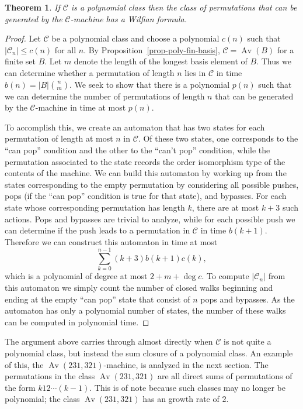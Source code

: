 \documentclass[10pt]{article}
\theoremstyle{plain}
\newtheorem{theorem}{Theorem}[section]
\theoremstyle{definition}
\newcommand{\Av}{\operatorname{Av}}
\newcommand{\C}{\mathcal{C}}
\begin{document}
\begin{theorem}
\label{thm-poly-machine}
If $\C$ is a polynomial class then the class of permutations that can be generated by the $\C$-machine has a Wilfian formula.
\end{theorem}
\begin{proof}
Let $\C$ be a polynomial class and choose a polynomial $c(n)$ such that $|\C_n|\le c(n)$ for all $n$. By Proposition~\ref{prop-poly-fin-basis}, $\C=\Av(B)$ for a finite set $B$. Let $m$ denote the length of the longest basis element of $B$. Thus we can determine whether a permutation of length $n$ lies in $\C$ in time $b(n)=|B|{n\choose m}$. We seek to show that there is a polynomial $p(n)$ such that we can determine the number of permutations of length $n$ that can be generated by the $\C$-machine in time at most $p(n)$.

To accomplish this, we create an automaton that has two states for each permutation of length at most $n$ in $\C$. Of these two states, one corresponds to the ``can pop'' condition and the other to the ``can't pop'' condition, while the permutation associated to the state records the order isomorphism type of the contents of the machine. We can build this automaton by working up from the states corresponding to the empty permutation by considering all possible pushes, pops (if the ``can pop'' condition is true for that state), and bypasses. For each state whose corresponding permutation has length $k$, there are at most $k+3$ such actions. Pops and bypasses are trivial to analyze, while for each possible push we can determine if the push leads to a permutation in $\C$ in time $b(k+1)$. Therefore we can construct this automaton in time at most
\[
	\sum_{k=0}^{n-1} (k+3)b(k+1)c(k),
\]
which is a polynomial of degree at most $2+m+\deg c$. To compute $|\C_n|$ from this automaton we simply count the number of closed walks beginning and ending at the empty ``can pop'' state that consist of $n$ pops and bypasses. As the automaton has only a polynomial number of states, the number of these walks can be computed in polynomial time.
\end{proof}

The argument above carries through almost directly when $\C$ is not quite a polynomial class, but instead the sum closure of a polynomial class. An example of this, the $\Av(231,321)$-machine, is analyzed in the next section. The permutations in the class $\Av(231,321)$ are all direct sums of permutations of the form $k12\cdots(k-1)$. This is of note because such classes may no longer be polynomial; the class $\Av(231,321)$ has an growth rate of $2$.
\end{document}
